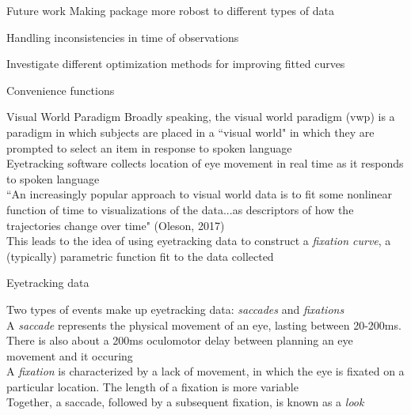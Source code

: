 \documentclass{beamer}
\begin{document}
\begin{frame}{Future work}
Making package more robost to different types of data \newline 

Handling inconsistencies in time of observations \newline 

Investigate different optimization methods for improving fitted curves \newline 

Convenience functions \newline

\end{frame}

\begin{frame}{Visual World Paradigm}
Broadly speaking, the visual world paradigm (vwp) is a paradigm in which subjects are placed in a ``visual world" in which they are prompted to select an item in response to spoken language \newline \\

Eyetracking software collects location of eye movement in real time as it responds to spoken language \newline \\

``An increasingly popular approach to visual world data is to fit some nonlinear function of time to visualizations of the data...as descriptors of how the trajectories change over time" (Oleson, 2017) \newline \\

This leads to the idea of using eyetracking data to construct a \textit{fixation curve}, a (typically) parametric function fit to the data collected


\end{frame}

\begin{frame}{Eyetracking data}

Two types of events make up eyetracking data: \textit{saccades} and \textit{fixations} \newline \\

A \textit{saccade} represents the physical movement of an eye, lasting between 20-200ms. There is also about a 200ms oculomotor delay between planning an eye movement and it occuring \newline \\

A \textit{fixation} is characterized by a lack of movement, in which the eye is fixated on a particular location. The length of a fixation is more  variable \newline \\

Together, a saccade, followed by a subsequent fixation, is known as a \textit{look}
\end{frame}
\end{document}
